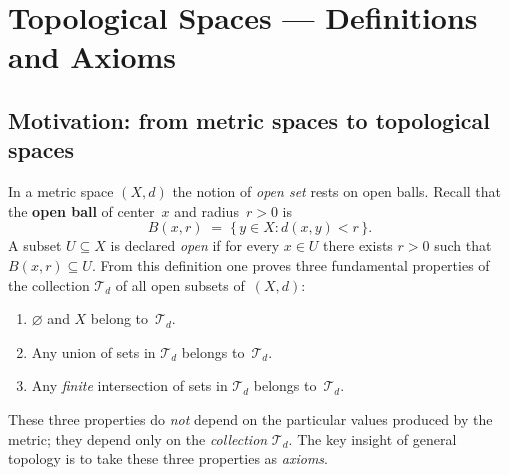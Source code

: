 \documentclass[11pt,a4paper,twoside]{book}
\theoremstyle{remark}
\theoremstyle{definition}
\theoremstyle{definition}
\newcommand{\Tau}{\mathcal{T}}           %
\begin{document}
\chapter{Topological Spaces --- Definitions and Axioms}
\label{chap:topological-spaces}

\section*{Motivation: from metric spaces to topological spaces}

In a metric space $(X,d)$ the notion of \emph{open set}
rests on open balls.
Recall that the \textbf{open ball} of center~$x$ and radius~$r>0$ is
\[
   B(x,r) \;=\; \{\, y\in X : d(x,y)<r \,\}.
\]
A subset $U\subseteq X$ is declared \emph{open} if for every $x\in U$ there
exists $r>0$ such that $B(x,r)\subseteq U$.  From this definition one proves
three fundamental properties of the collection $\Tau_d$ of all open subsets
of~$(X,d)$:

\begin{enumerate}[label=(\roman*)]
  \item $\varnothing$ and $X$ belong to~$\Tau_d$.
  \item Any union of sets in $\Tau_d$ belongs to~$\Tau_d$.
  \item Any \emph{finite} intersection of sets in $\Tau_d$ belongs to~$\Tau_d$.
\end{enumerate}

These three properties do \emph{not} depend on the particular values produced
by the metric; they depend only on the \emph{collection} $\Tau_d$.  The key
insight of general topology is to take these three properties as \emph{axioms}.

\begin{center}
\end{center}
\end{document}
